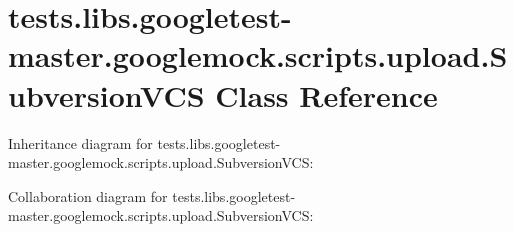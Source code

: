 \hypertarget{classtests_1_1libs_1_1googletest-master_1_1googlemock_1_1scripts_1_1upload_1_1SubversionVCS}{}\section{tests.\+libs.\+googletest-\/master.googlemock.\+scripts.\+upload.\+Subversion\+V\+CS Class Reference}
\label{classtests_1_1libs_1_1googletest-master_1_1googlemock_1_1scripts_1_1upload_1_1SubversionVCS}


Inheritance diagram for tests.\+libs.\+googletest-\/master.googlemock.\+scripts.\+upload.\+Subversion\+V\+CS\+:


Collaboration diagram for tests.\+libs.\+googletest-\/master.googlemock.\+scripts.\+upload.\+Subversion\+V\+CS\+:
